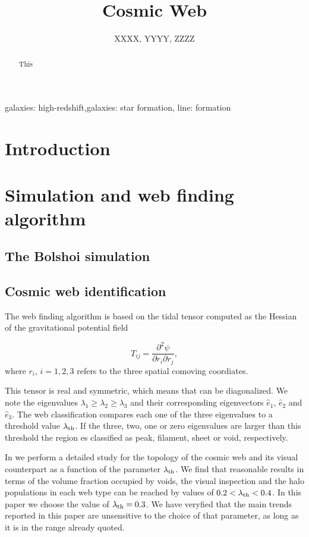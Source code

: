 \documentclass{emulateapj}
\begin{document}
\title{Cosmic Web} 
\author{
  XXXX,
  YYYY,
  ZZZZ
}

\begin{abstract}
This
\end{abstract}

\begin{keywords}
{galaxies: high-redshift,galaxies: star formation, line: formation}
\end{keywords}


\section{Introduction}
\label{sec:intro}

\section{Simulation and web finding algorithm}
\label{sec:Simulation}

\subsection{The Bolshoi simulation}


\subsection{Cosmic web identification}
The web finding algorithm is based on the tidal tensor computed as the
Hessian of the  gravitational potential field

\begin{equation}
T_{ij} = \frac{\partial^2 \psi}{\partial r_i \partial r_j}, 
\end{equation}
where $r_{i}$, $i=1,2,3$ refers to the three spatial comoving
coordiates. 

This tensor is real and symmetric, which means that can be
diagonalized. We note the eigenvalues $\lambda_1\geq \lambda_2\geq
\lambda_3$ and their corresponding eigenvectors $\hat{e}_1$,
$\hat{e}_2$ and $\hat{e}_3$. The web classification compares each one
of the three eigenvalues to a threshold value $\lambda_{\rm th}$. If the three, two, one or zero eigenvalues are larger than this threshold the region es classified as peak, filament, sheet or void, respectively. 

In \cite{Tweb} we perform a detailed study for the topology of the
cosmic web and its visual counterpart as a function of the parameter
$\lambda_{\rm th}$. We find that reasonable results in terms of the
volume fraction occupied by voids, the visual inspection and the halo
populations in each web type can be reached by values of $0.2<\lambda_{\rm
th}<0.4$. In this paper we choose the value of $\lambda_{\rm
  th}=0.3$. We have veryfied that the main trends reported in this
paper are unsensitive to the choice of that parameter, as long as it
is in the range already quoted.
\end{document}
